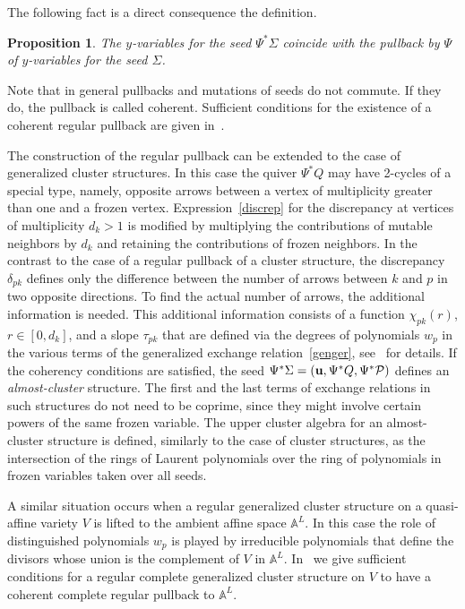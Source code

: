 \documentclass{amsart}
\newtheorem{proposition}[theorem]{Proposition}
\theoremstyle{definition}
\theoremstyle{remark}
\numberwithin{equation}{section}
\numberwithin{theorem}{section}
\def\AA{{\mathbb A}}
\def\P{{\mathcal P}}
\def\u{{\bf u}}
\begin{document}
The following fact is a direct consequence the definition.

\begin{proposition}\label{regpullback}
The $y$-variables for the seed $\Psi^*\Sigma$ coincide with the pullback by $\Psi$ of $y$-variables 
for the seed $\Sigma$.
\end{proposition}

Note that in general pullbacks and mutations of seeds do not commute. If they do, the pullback is called coherent. Sufficient conditions for the existence of a coherent regular pullback are given in~\cite{GSVpullback}.

The construction of the regular pullback can be extended to the case of generalized cluster structures. In this case the quiver $\Psi^* Q$ may have 2-cycles of a special type, namely,  opposite arrows between a vertex of multiplicity greater than one and a frozen vertex. %
Expression~\eqref{discrep} for the discrepancy at vertices of multiplicity $d_k>1$ is modified by multiplying
the contributions of mutable neighbors by $d_k$ and retaining the contributions of frozen neighbors. In the contrast to the case of a regular pullback of  a cluster structure, the discrepancy $\delta_{pk}$ defines only the difference between the number of arrows between $k$ and $p$ in two opposite directions. To find the actual number of arrows, the additional information is needed.
This additional information consists of a function $\chi_{pk}(r)$, $r\in[0,d_k]$, and a slope $\tau_{pk}$ that are defined 
via the degrees of polynomials $w_p$ in the various terms of the generalized exchange relation~\eqref{genger}, 
see~\cite[Section 4]{GSVpullback} for details. If the coherency conditions are satisfied, the seed $\Psi^*\Sigma=(\u,\Psi^* Q,\Psi^*\P)$ defines an {\it almost-cluster\/} structure.   The first and the last terms of exchange relations in
such structures do not need to be coprime, since they might involve certain powers of the same frozen variable. 
The upper cluster algebra for an almost-cluster structure is defined, similarly to the case of cluster structures, as the intersection of the rings of Laurent polynomials over the ring of polynomials in frozen variables taken over all seeds.


A similar situation occurs when a regular generalized cluster structure on a quasi-affine variety $V$ is lifted to the ambient affine space $\AA^L$. In this case the role of distinguished polynomials $w_p$ is played by irreducible polynomials that define the divisors whose union is the complement of $V$ in $\AA^L$. In~\cite[Theorem 6.2]{GSVpullback} we give sufficient conditions for a regular complete generalized cluster structure on $V$
to have a coherent complete regular pullback to $\AA^L$.
\end{document}
